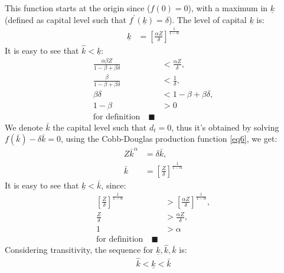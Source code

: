 \documentclass[12pt]{report}
\begin{document}
This function starts at the origin since (\(f(0)=0\)), with a maximum in \(\underline{k}\) (defined as capital level
such that \(f^{\prime}(\underline{k})=\delta\)). The level of capital \(\underline{k}\) is:
\begin{align}
    \underline{k} &= \left[\frac{\alpha Z}{\delta}\right]^{\frac{1}{1-\alpha}}  \label{eq19}
\end{align}
It is easy to see that \(\hat{k}<\underline{k}\):
\begin{align*}
    \frac{\alpha \beta Z}{1-\beta+\beta \delta}&<\frac{\alpha Z}{\delta},\\
    \frac{\beta}{1-\beta+\beta \delta}&<\frac{1}{\delta},\\
    \beta \delta &<1-\beta + \beta \delta, \\
    1-\beta&>0 \\
    \text{for definition} \quad \blacksquare 
\end{align*}
We denote \(\bar{k}\) the capital level such that \(d_t=0\), thus it's obtained by solving \(f(\bar{k}) -\delta
\bar{k} = 0\), using the Cobb-Douglas production function \ref{eq6}, we get:
\begin{align}
    Z \bar{k}^{\alpha} &= \delta \bar{k}, \nonumber\\
    \bar{k}&=\left[\frac{Z}{\delta}\right]^{\frac{1}{1-\alpha}}
\end{align}
It is easy to see that \(\underline{k}<\bar{k}\), since:
\begin{align}
    \left[\frac{Z}{\delta}\right]^{\frac{1}{1-\alpha}}&>\left[\frac{\alpha Z}{\delta}\right]^{\frac{1}{1-\alpha}},\nonumber\\
    \frac{Z}{\delta}&>\frac{\alpha Z}{\delta}, \nonumber \\
    1&>\alpha \nonumber \\
    \text{for definition} \quad \blacksquare 
\end{align}
Considering transitivity, the sequence for \(\underline{k}, \hat{k}, \bar{k}\) is:
\begin{align*}
    \hat{k} < \underline{k} < \bar{k}
\end{align*}
\end{document}
